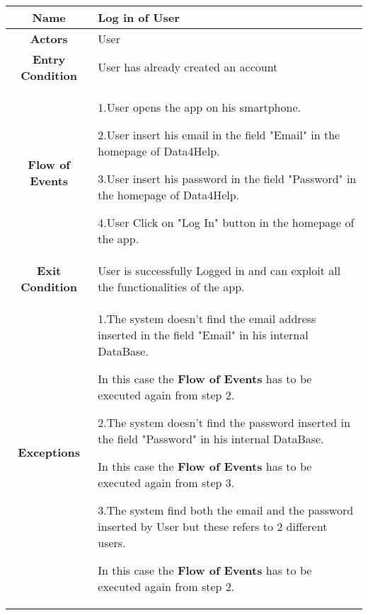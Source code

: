     \subsubsection{}
      \begin{table}[h!]
        \centering
        \begin{tabularx}{\linewidth}{|c|X|}
          \hline
          \textbf{Name} & Log in of User \\
        	\hline
        	\textbf{Actors} & User \\
        	\hline
        	\textbf{Entry Condition} & User has already created an account\\
        	\hline
        	\textbf{Flow of Events} & 1.User opens the app on his smartphone.

        					2.User insert his email in the field "Email" in the homepage of Data4Help.

        					3.User insert his password in the field "Password" in the homepage of Data4Help.

        					4.User Click on "Log In" button in the homepage of the app.\\
        	\hline
        	\textbf{Exit Condition} & User is successfully Logged in and can exploit all the functionalities of the app. \\
        	\hline
        	\textbf{Exceptions} & 1.The system doesn't find the email address inserted in the field "Email" in his internal DataBase.

        				In this case the \textbf{Flow of Events} has to be executed again from step 2.

        				2.The system doesn't find the password inserted in the field "Password" in his internal DataBase.

        				 In this case the \textbf{Flow of Events} has to be executed again from step 3.

        				3.The system find both the email and the password inserted by User but these refers to 2 different users.

        				In this case the \textbf{Flow of Events} has to be executed again from step 2. \\
          \hline
        \end{tabularx}
      \end{table}

    \subsubsection{}

